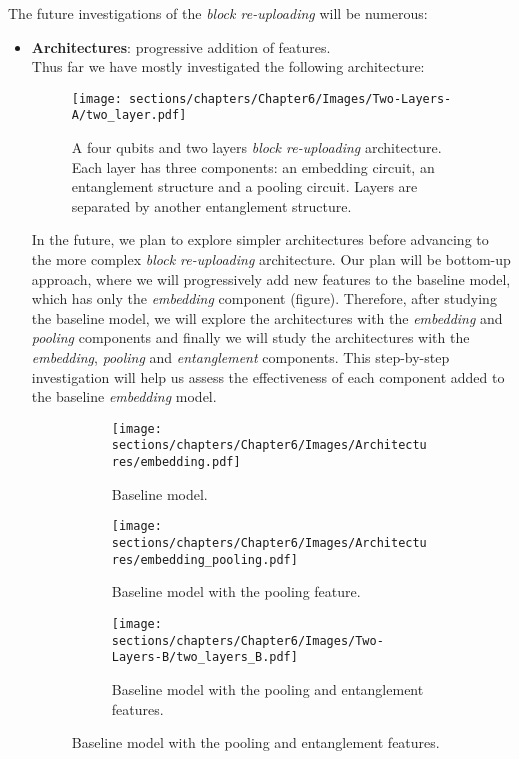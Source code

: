 
The future investigations of the \textit{block re-uploading} will be numerous:

\begin{itemize}
    \item \textbf{Architectures}: progressive addition of features.\\
    Thus far we have mostly investigated the following architecture:

    \begin{figure}[h]
        \centering
        \texttt{[image: sections/chapters/Chapter6/Images/Two-Layers-A/two\_layer.pdf]}
        \caption{A four qubits and two layers \textit{block re-uploading} architecture. Each layer has three 
        components: an embedding circuit, an entanglement structure and a pooling circuit.
        Layers are separated by another entanglement structure.}
    \end{figure}

    In the future, we plan to explore simpler architectures before advancing to the more 
    complex \textit{block re-uploading} architecture. 
    Our plan will be bottom-up approach, where we will progressively add new features to the baseline model, 
    which has only the \textit{embedding} component (figure).
    Therefore, after studying the baseline model, we will explore the architectures with the 
    \textit{embedding} and \textit{pooling} components and finally we will study the architectures 
    with the \textit{embedding}, \textit{pooling} and \textit{entanglement} components.
    This step-by-step investigation will 
    help us assess the effectiveness of each component added to the baseline \textit{embedding} model.

    \begin{figure}[h]
        \centering
        \begin{subfigure}[b]{0.6\textwidth}
            \texttt{[image: sections/chapters/Chapter6/Images/Architectures/embedding.pdf]}
        \caption{Baseline model.}
        \end{subfigure}
        \begin{subfigure}[b]{0.6\textwidth}
            \texttt{[image: sections/chapters/Chapter6/Images/Architectures/embedding\_pooling.pdf]}
        \caption{Baseline model with the pooling feature.}
        \end{subfigure}
        \begin{subfigure}[b]{0.6\textwidth}
            \texttt{[image: sections/chapters/Chapter6/Images/Two-Layers-B/two\_layers\_B.pdf]}
        \caption{Baseline model with the pooling and entanglement features.}
        \end{subfigure}
    \end{figure}

\end{itemize}